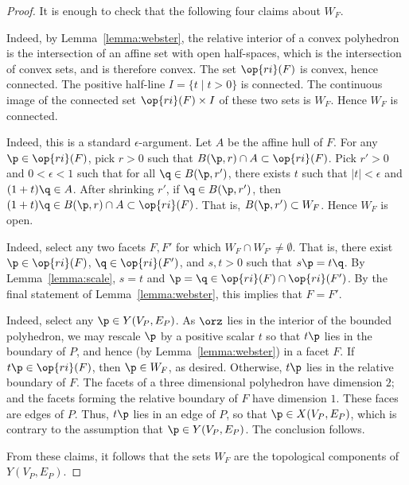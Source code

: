 \begin{proof} It is enough to check that the following four claims
about $W_F$.

 Indeed, by Lemma~\ref{lemma:webster},
the relative interior of a convex polyhedron is the intersection of
an affine set with open half-spaces, which is the intersection of
convex sets, and is therefore convex. The set $\op{ri}(F)$ is
convex, hence connected.  The positive half-line $I=\{t\mid t>0\}$
is connected.  The continuous image of the connected set
$\op{ri}(F)\times I$ of these two sets is $W_F$.  Hence $W_F$ is
connected.

  Indeed, this is a standard
$\epsilon$-argument.  Let $A$ be the affine hull of $F$.  For any
$\p\in \op{ri}(F)$, pick $r>0$ such that $B(\p,r)\cap A\subset
\op{ri}(F)$.  Pick $r'>0$ and $0<\epsilon<1$ such that for all
$\q\in B(\p,r')$, there exists $t$ such that $|t|<\epsilon$ and
$(1+t)\q\in A$.  After shrinking $r'$, if $\q\in B(\p,r')$, then
$(1+t)\q \in B(\p,r)\cap A \subset \op{ri}(F)$.  That is,
$B(\p,r')\subset W_F$.  Hence $W_F$ is open.

  Indeed, select any two facets $F,F'$ for
which $W_F\cap W_{F'}\ne \emptyset$.  That is, there exist $\p\in
\op{ri}(F)$, $\q\in \op{ri}(F')$, and $s,t>0$ such that $s \p = t
\q$.  By Lemma~\ref{lemma:scale}, $s=t$ and $\p=\q\in \op{ri}(F)\cap
\op{ri}(F')$.  By the final statement of Lemma~\ref{lemma:webster},
this implies that $F=F'$.

  Indeed,
select any $\p\in Y(V_P,E_P)$.  As $\orz$ lies in the interior of
the bounded polyhedron, we may rescale $\p$ by a positive scalar $t$
so that $t \p$ lies in the boundary of $P$, and hence (by
Lemma~\ref{lemma:webster}) in a facet $F$.  If $t \p \in
\op{ri}(F)$, then $\p\in W_F$, as desired.  Otherwise, $t \p$ lies
in the relative boundary of $F$.  The facets of a three dimensional
polyhedron have dimension $2$; and the facets forming the relative
boundary of $F$ have dimension $1$.  These faces are edges of $P$.
Thus, $t \p$ lies in an edge of $P$, so that $\p\in X(V_P,E_P)$,
which is contrary to the assumption that $\p\in Y(V_P,E_P)$.  The
conclusion follows.

From these claims, it follows that the sets $W_F$ are the
topological components of $Y(V_P,E_P)$.
\end{proof}
%

